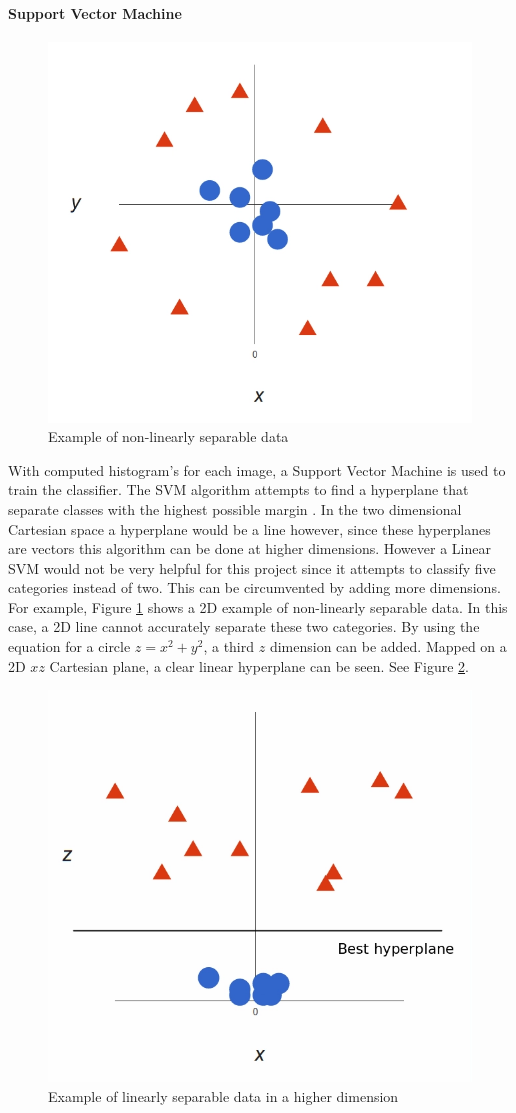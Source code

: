 \documentclass[stu,hidelinks,floatsintext,donotrepeattitle]{apa7}
\begin{document}
\paragraph{Support Vector Machine}
\begin{figure}[!h]
  \centering
  \captionsetup{justification=centering}
  \includegraphics[width=.5\textwidth]{non-linear}
  \vspace*{3mm}
  \caption{Example of non-linearly separable data \parencite{svm-img}}
  \label{fig:non-linear}
\end{figure}
With computed histogram's for each image, a Support Vector Machine is used to train the classifier. The SVM algorithm attempts to find a hyperplane that separate classes with the highest possible margin \parencite{svm}. In the two dimensional Cartesian space a hyperplane would be a line however, since these hyperplanes are vectors this algorithm can be done at higher dimensions. However a Linear SVM would not be very helpful for this project since it attempts to classify five categories instead of two. This can be circumvented by adding more dimensions. For example, Figure \ref{fig:non-linear} shows a 2D example of non-linearly separable data. In this case, a 2D line cannot accurately separate these two categories. By using the equation for a circle $z=x^2+y^2$, a third $z$ dimension can be added. Mapped on a 2D $xz$ Cartesian plane, a clear linear hyperplane can be seen. See Figure \ref{fig:x-z-hyper}.
\begin{figure}[!h]
  \centering
  \captionsetup{justification=centering}
  \includegraphics[width=.5\textwidth]{x-z-hyper}
  \vspace*{3mm}
  \caption{Example of linearly separable data in a higher dimension \parencite{svm-img}}
  \label{fig:x-z-hyper}
\end{figure}
\end{document}
